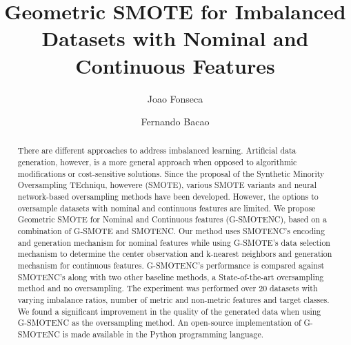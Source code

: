 \documentclass[preprint,12pt]{elsarticle}
\begin{document}
{\setlength{\tabcolsep}{2.5pt}

\begin{frontmatter}

\title{Geometric SMOTE for Imbalanced Datasets with Nominal and Continuous Features}

\author[inst1]{Joao Fonseca}
\author[inst1]{Fernando Bacao}


\begin{abstract}

    There are different approaches to address imbalanced learning. Artificial
    data generation, however, is a more general approach when opposed to
    algorithmic modifications or cost-sensitive solutions. Since the proposal
    of the Synthetic Minority Oversampling TEchniqu, howevere (SMOTE), various
    SMOTE variants and neural network-based oversampling methods have been
    developed.  However, the options to oversample datasets with nominal and
    continuous features are limited. We propose Geometric SMOTE for Nominal
    and Continuous features (G-SMOTENC), based on a combination of G-SMOTE and
    SMOTENC. Our method uses SMOTENC's encoding and generation mechanism for
    nominal features while using G-SMOTE's data selection mechanism to
    determine the center observation and k-nearest neighbors and generation
    mechanism for continuous features. G-SMOTENC's performance is compared
    against SMOTENC's along with two other baseline methods, a
    State-of-the-art oversampling method and no oversampling. The experiment
    was performed over 20 datasets with varying imbalance ratios, number of
    metric and non-metric features and target classes. We found a significant
    improvement in the quality of the generated data when using G-SMOTENC as
    the oversampling method. An open-source implementation of G-SMOTENC is
    made available in the Python programming language.

\end{abstract}



\end{frontmatter}}
\end{document}
